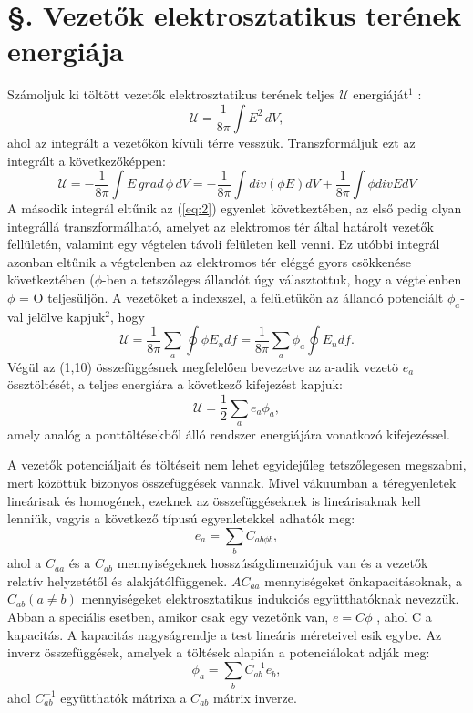 \documentclass{article}
\begin{document}
\section{§. Vezetők elektrosztatikus terének energiája}
Számoljuk ki töltött vezetők elektrosztatikus terének teljes $\mathcal{U}$ energiáját$^1$ :
\begin{equation} \label{eq:1}
\mathcal{U} = \frac{1}{8\pi} \int E^2 \, dV,
\end{equation}
ahol az integrált a vezetőkön kívüli térre vesszük. Transzformáljuk ezt az integrált a következőképpen:
\begin{equation} \label{eq:2}
\mathcal{U} = -\frac{1}{8\pi} \int E \, grad \, \phi \, dV = -\frac{1}{8\pi} \int div (\phi E) dV + \frac{1}{8\pi} \int \phi div E dV
\end{equation}
A második integrál eltűnik az (\ref{eq:2}) egyenlet következtében, az első pedig olyan integrállá transzformálható, amelyet az elektromos tér által határolt vezetők fellületén, valamint egy végtelen távoli felületen kell venni. Ez utóbbi integrál azonban eltűnik a végtelenben az elektromos tér eléggé gyors csökkenése következtében ($\phi$-ben a tetszőleges állandót úgy választottuk, hogy a végtelenben $\phi$ = O teljesüljön. A vezetőket a indexszel, a felületükön az állandó potenciált $\phi_a$-val jelölve kapjuk$^2$, hogy
\begin{equation} \label{eq:3}
\mathcal{U} = \frac{1}{8\pi} \sum\limits_{a} \oint \phi E_n df = \frac{1}{8\pi} \sum\limits_{a} \phi_a \oint E_n df.
\end{equation}
Végül az (1,10) összefüggésnek megfelelően bevezetve az a-adik vezetö $e_a$ össztöltését, a teljes energiára a következő kifejezést kapjuk:
\begin{equation} \label{eq:4}
\mathcal{U} = \frac{1}{2} \sum\limits_{a} e_a \phi_a ,
\end{equation}
amely analóg a ponttöltésekből álló rendszer energiájára vonatkozó kifejezéssel.

A vezetők potenciáljait és töltéseit nem lehet egyidejűleg tetszőlegesen megszabni, mert közöttük bizonyos összefüggések vannak. Mivel vákuumban a téregyenletek lineárisak és homogének, ezeknek az összefüggéseknek is lineárisaknak kell lenniük, vagyis a következő típusú egyenletekkel adhatók meg:
\begin{equation} \label{eq:5}
e_a = \sum\limits_{b} C_{ab\phi b} ,
\end{equation}
ahol a $C_{aa}$ és a $C_{ab}$ mennyiségeknek hosszúságdimenziójuk van és a vezetők relatív helyzetétől és alakjátólfüggenek. $AC_{aa}$ mennyiségeket önkapacitásoknak, a $C_{ab}(a \neq b)$ mennyiségeket elektrosztatikus indukciós együtthatóknak nevezzük. Abban a
speciális esetben, amikor csak egy vezetőnk van, $e = C\phi$ , ahol C a kapacitás. A kapacitás nagyságrendje a test lineáris méreteivel esik egybe. Az inverz összefüggések, amelyek a töltések alapián a potenciálokat adják meg:
\begin{equation} \label{eq:6}
\phi_a = \sum\limits_{b} C_{ab}^{-1} e_b ,
\end{equation}
ahol $C_{ab}^{-1}$ együtthatók mátrixa a $C_{ab}$ mátrix inverze.
\end{document}
